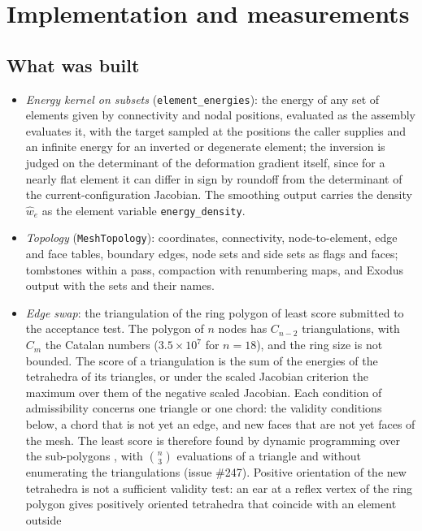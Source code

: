 \documentclass[11pt]{article}
\newcommand{\code}[1]{\texttt{#1}}
\begin{document}
\section{Implementation and measurements}
\label{sec:implementation}

\subsection{What was built}

\begin{itemize}[itemsep=2pt]
\item \emph{Energy kernel on subsets} (\code{element\_energies}): the
  energy of any set of elements given by connectivity and nodal
  positions, evaluated as the assembly evaluates it, with the target
  sampled at the positions the caller supplies and an infinite energy for
  an inverted or degenerate element; the inversion is judged on the
  determinant of the deformation gradient itself, since for a nearly flat
  element it can differ in sign by roundoff from the determinant of the
  current-configuration Jacobian. The smoothing output carries the
  density $\hat w_e$ as the element variable \code{energy\_density}.
\item \emph{Topology} (\code{MeshTopology}): coordinates, connectivity,
  node-to-element, edge and face tables, boundary edges, node sets and
  side sets as flags and faces; tombstones within a pass, compaction with
  renumbering maps, and Exodus output with the sets and their names.
\item \emph{Edge swap}: the triangulation of the ring polygon of least
  score submitted to the acceptance test. The polygon of $n$ nodes has
  $C_{n-2}$ triangulations, with $C_m$ the Catalan numbers
  ($3.5\times10^{7}$ for $n = 18$), and the ring size is not bounded.
  The score of a triangulation is the sum of the energies of the
  tetrahedra of its triangles, or under the scaled Jacobian criterion the
  maximum over them of the negative scaled Jacobian. Each condition of
  admissibility concerns one triangle or one chord: the validity
  conditions below, a chord that is not yet an edge, and new faces that
  are not yet faces of the mesh. The least score is therefore found by
  dynamic programming over the sub-polygons \cite{klincsek1980}, with
  $\binom{n}{3}$ evaluations of a triangle and without enumerating the
  triangulations (issue \#247). Positive orientation of the new
  tetrahedra is not a sufficient validity test: an ear at a reflex vertex of the ring polygon gives
  positively oriented tetrahedra that coincide with an element outside

\end{itemize}
\end{document}
